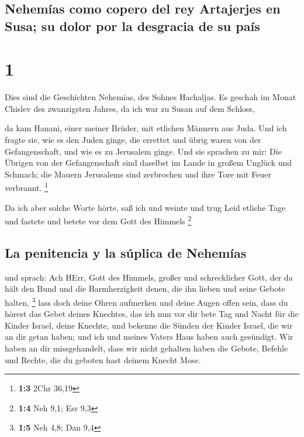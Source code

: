 \hypertarget{nehemuxedas-como-copero-del-rey-artajerjes-en-susa-su-dolor-por-la-desgracia-de-su-pauxeds}{%
\subsection{Nehemías como copero del rey Artajerjes en Susa; su dolor
por la desgracia de su
país}\label{nehemuxedas-como-copero-del-rey-artajerjes-en-susa-su-dolor-por-la-desgracia-de-su-pauxeds}}

\hypertarget{section}{%
\section{1}\label{section}}

 Dies sind die Geschichten Nehemias, des Sohnes Hachaljas.
Es geschah im Monat Chislev des zwanzigsten Jahres, da ich war zu Susan
auf dem Schloss,

 da kam Hanani, einer meiner Brüder, mit etlichen Männern
aus Juda. Und ich fragte sie, wie es den Juden ginge, die errettet und
übrig waren von der Gefangenschaft, und wie es zu Jerusalem ginge.
 Und sie sprachen zu mir: Die Übrigen von der
Gefangenschaft sind daselbst im Lande in großem Unglück und Schmach; die
Mauern Jerusalems sind zerbrochen und ihre Tore mit Feuer verbrannt.
\footnote{\textbf{1:3} 2Chr 36,19}

 Da ich aber solche Worte hörte, saß ich und weinte und
trug Leid etliche Tage und fastete und betete vor dem Gott des Himmels
\footnote{\textbf{1:4} Neh 9,1; Esr 9,3}

\hypertarget{la-penitencia-y-la-suxfaplica-de-nehemuxedas}{%
\subsection{La penitencia y la súplica de
Nehemías}\label{la-penitencia-y-la-suxfaplica-de-nehemuxedas}}

 und sprach: Ach HErr, Gott des Himmels, großer und
schrecklicher Gott, der da hält den Bund und die Barmherzigkeit denen,
die ihn lieben und seine Gebote halten, \footnote{\textbf{1:5} Neh 4,8;
  Dan 9,4}  lass doch deine Ohren aufmerken und deine
Augen offen sein, dass du hörest das Gebet deines Knechtes, das ich nun
vor dir bete Tag und Nacht für die Kinder Israel, deine Knechte, und
bekenne die Sünden der Kinder Israel, die wir an dir getan haben; und
ich und meines Vaters Haus haben auch gesündigt.  Wir
haben an dir missgehandelt, dass wir nicht gehalten haben die Gebote,
Befehle und Rechte, die du geboten hast deinem Knecht Mose.

